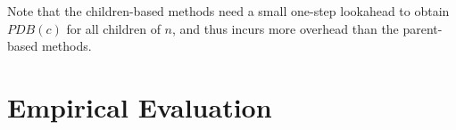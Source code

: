 \documentclass{article}
\newtheorem{example}{Example}
\begin{document}
Note that the children-based methods need a small one-step lookahead to obtain $PDB(c)$ for all children of $n$, and thus incurs more overhead than the parent-based methods. 






%



\section{Empirical Evaluation}
\end{document}
